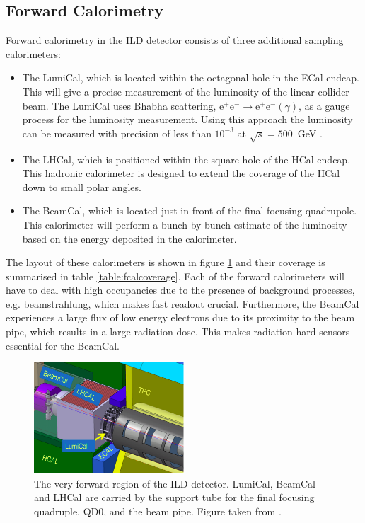 \subsection{Forward Calorimetry}
Forward calorimetry in the ILD detector consists of three additional sampling calorimeters:
\begin{itemize}
\item The LumiCal, which is located within the octagonal hole in the ECal endcap.  This will give a precise measurement of the luminosity of the linear collider beam.   The LumiCal uses Bhabha scattering, $\text{e}^{+}\text{e}^{-} \rightarrow \text{e}^{+}\text{e}^{-}(\gamma)$, as a gauge process for the luminosity measurement.  Using this approach the luminosity can be measured with precision of less than $10^{-3}$ at $\sqrt{s}=500$~GeV \cite{arXiv:1006.3396}. 
\item The LHCal, which is positioned within the square hole of the HCal endcap.  This hadronic calorimeter is designed to extend the coverage of the HCal down to small polar angles.  
\item The BeamCal, which is located just in front of the final focusing quadrupole.  This calorimeter will perform a bunch-by-bunch estimate of the luminosity based on the energy deposited in the calorimeter.
\end{itemize}
The layout of these calorimeters is shown in figure \ref{fig:fcal} and their coverage is summarised in table \ref{table:fcalcoverage}.  Each of the forward calorimeters will have to deal with high occupancies due to the presence of background processes, e.g. beamstrahlung, which makes fast readout crucial.  Furthermore, the BeamCal experiences a large flux of low energy electrons due to its proximity to the beam pipe, which results in a large radiation dose.  This makes radiation hard sensors essential for the BeamCal.  

\begin{figure}[h!]
\centering
\includegraphics[width=0.5\textwidth]{LCDetectorsAndPFlow/Plots/Pictures/FCal.png}
\caption[The very forward region of the ILD detector.  LumiCal, BeamCal and LHCal are carried by the support tube for the final focusing quadruple, QD0, and the beam pipe.  Figure taken from  \cite{Behnke:2013lya}.]{The very forward region of the ILD detector.  LumiCal, BeamCal and LHCal are carried by the support tube for the final focusing quadruple, QD0, and the beam pipe.  Figure taken from  \cite{Behnke:2013lya}.}
\label{fig:fcal}
\end{figure} 

